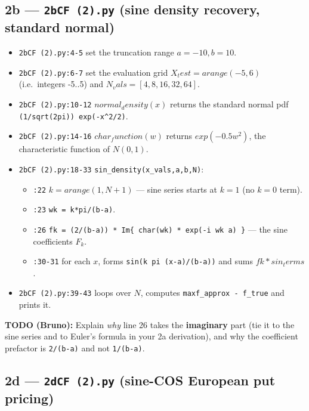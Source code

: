 \documentclass[
  11pt,
]{article}
\providecommand{\tightlist}{%
  \setlength{\itemsep}{0pt}\setlength{\parskip}{0pt}}
\begin{document}
\hypertarget{b-2bcf-2.py-sine-density-recovery-standard-normal}{%
\subsection{\texorpdfstring{2b --- \texttt{2bCF\ (2).py} (sine density
recovery, standard
normal)}{2b --- 2bCF (2).py (sine density recovery, standard normal)}}\label{b-2bcf-2.py-sine-density-recovery-standard-normal}}

\begin{itemize}
\tightlist
\item
  \texttt{2bCF\ (2).py:4-5} set the truncation range \(a=-10, b=10\).
\item
  \texttt{2bCF\ (2).py:6-7} set the evaluation grid
  \(X_test = arange(-5,6)\) (i.e.~integers -5..5) and
  \(N_vals = [4,8,16,32,64]\).
\item
  \texttt{2bCF\ (2).py:10-12} \(normal_density(x)\) returns the standard
  normal pdf \texttt{(1/sqrt(2pi))\ exp(-x\^{}2/2)}.
\item
  \texttt{2bCF\ (2).py:14-16} \(char_function(w)\) returns
  \(exp(-0.5 w^2)\), the characteristic function of \(N(0,1)\).
\item
  \texttt{2bCF\ (2).py:18-33} \texttt{sin\_density(x\_vals,a,b,N)}:

  \begin{itemize}
  \tightlist
  \item
    \texttt{:22} \(k = arange(1, N+1)\) --- sine series starts at
    \(k=1\) (no \(k=0\) term).
  \item
    \texttt{:23} \texttt{wk\ =\ k*pi/(b-a)}.
  \item
    \texttt{:26}
    \texttt{fk\ =\ (2/(b-a))\ *\ Im\{\ char(wk)\ *\ exp(-i\ wk\ a)\ \}}
    --- the sine coefficients \(F_k\).
  \item
    \texttt{:30-31} for each \(x\), forms
    \texttt{sin(k\ pi\ (x-a)/(b-a))} and sums \(fk * sin_terms\).
  \end{itemize}
\item
  \texttt{2bCF\ (2).py:39-43} loops over \(N\), computes
  \texttt{max\textbar{}f\_approx\ -\ f\_true\textbar{}} and prints it.
\end{itemize}

\textbf{TODO (Bruno):} Explain \emph{why} line 26 takes the
\textbf{imaginary} part (tie it to the sine series and to Euler's
formula in your 2a derivation), and why the coefficient prefactor is
\texttt{2/(b-a)} and not \texttt{1/(b-a)}.

\hypertarget{d-2dcf-2.py-sine-cos-european-put-pricing}{%
\subsection{\texorpdfstring{2d --- \texttt{2dCF\ (2).py} (sine-COS
European put
pricing)}{2d --- 2dCF (2).py (sine-COS European put pricing)}}\label{d-2dcf-2.py-sine-cos-european-put-pricing}}
\end{document}
